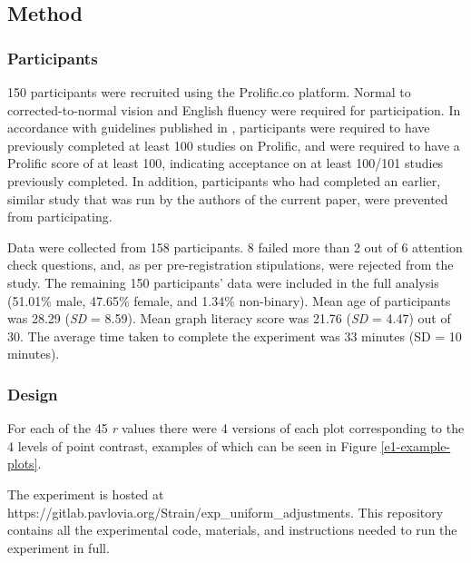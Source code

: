 \documentclass[preprint, 3p,
authoryear]{elsarticle} %
\begin{document}
\hypertarget{method}{%
\subsection{Method}\label{method}}

\hypertarget{participants}{%
\subsubsection{Participants}\label{participants}}

150 participants were recruited using the Prolific.co platform. Normal
to corrected-to-normal vision and English fluency were required for
participation. In accordance with guidelines published in
\citet{peer_2021}, participants were required to have previously
completed at least 100 studies on Prolific, and were required to have a
Prolific score of at least 100, indicating acceptance on at least
100/101 studies previously completed. In addition, participants who had
completed an earlier, similar study that was run by the authors of the
current paper, were prevented from participating.

Data were collected from 158 participants. 8 failed more than 2 out of 6
attention check questions, and, as per pre-registration stipulations,
were rejected from the study. The remaining 150 participants' data were
included in the full analysis (51.01\% male, 47.65\% female, and 1.34\%
non-binary). Mean age of participants was 28.29 (\emph{SD} = 8.59). Mean
graph literacy score was 21.76 (\emph{SD} = 4.47) out of 30. The average
time taken to complete the experiment was 33 minutes (SD = 10 minutes).

\hypertarget{design}{%
\subsubsection{Design}\label{design}}

For each of the 45 \emph{r} values there were 4 versions of each plot
corresponding to the 4 levels of point contrast, examples of which can
be seen in Figure \ref{e1-example-plots}.

The experiment is hosted at
https://gitlab.pavlovia.org/Strain/exp\_uniform\_adjustments. This
repository contains all the experimental code, materials, and
instructions needed to run the experiment in full.
\end{document}
